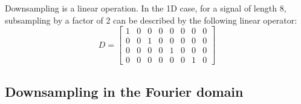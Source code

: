 Downsampling is a linear operation. In the 1D case, for a signal of length 8, subsampling by a factor of 2 can be described by the following linear operator:
\begin{equation}
D = \left[ 
\begin{array}{cccccccc}
1 & 0 & 0 & 0 & 0 & 0 & 0 & 0\\
0 & 0 & 1 & 0 & 0 & 0 & 0 & 0\\
0 & 0 & 0 & 0 & 1 & 0 & 0 & 0\\ 
0 & 0 & 0 & 0 & 0 & 0 & 1 & 0 
\end{array}
\right]
\end{equation}



\subsection{Downsampling in the Fourier domain}

